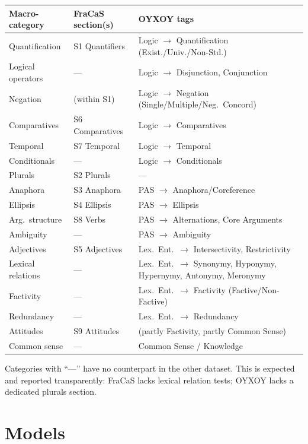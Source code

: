 \documentclass[11pt,a4paper]{article}
\begin{document}
\begin{table}[h!]
\centering\small
\begin{tabularx}{\textwidth}{l l l}
\toprule
\textbf{Macro-category} & \textbf{FraCaS section(s)} & \textbf{OYXOY tags} \\
\midrule
Quantification & S1 Quantifiers & Logic $\to$ Quantification (Exist./Univ./Non-Std.) \\
Logical operators & --- & Logic $\to$ Disjunction, Conjunction \\
Negation & (within S1) & Logic $\to$ Negation (Single/Multiple/Neg.\ Concord) \\
Comparatives & S6 Comparatives & Logic $\to$ Comparatives \\
Temporal & S7 Temporal & Logic $\to$ Temporal \\
Conditionals & --- & Logic $\to$ Conditionals \\
Plurals & S2 Plurals & --- \\
Anaphora & S3 Anaphora & PAS $\to$ Anaphora/Coreference \\
Ellipsis & S4 Ellipsis & PAS $\to$ Ellipsis \\
Arg.\ structure & S8 Verbs & PAS $\to$ Alternations, Core Arguments \\
Ambiguity & --- & PAS $\to$ Ambiguity \\
Adjectives & S5 Adjectives & Lex.\ Ent.\ $\to$ Intersectivity, Restrictivity \\
Lexical relations & --- & Lex.\ Ent.\ $\to$ Synonymy, Hyponymy, Hypernymy, Antonymy, Meronymy \\
Factivity & --- & Lex.\ Ent.\ $\to$ Factivity (Factive/Non-Factive) \\
Redundancy & --- & Lex.\ Ent.\ $\to$ Redundancy \\
Attitudes & S9 Attitudes & (partly Factivity, partly Common Sense) \\
Common sense & --- & Common Sense / Knowledge \\
\bottomrule
\end{tabularx}
\end{table}

Categories with ``---'' have no counterpart in the other dataset. This is expected and reported transparently: FraCaS lacks lexical relation tests; OYXOY lacks a dedicated plurals section.

\section{Models}
\end{document}
